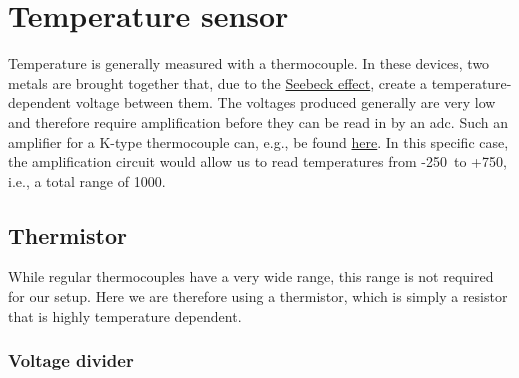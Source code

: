 
\chapter{Temperature sensor}\label{chap:temperature}

Temperature is generally measured with a thermocouple. In these devices, two metals are brought together that, due to the \href{https://en.wikipedia.org/wiki/Thermoelectric_effect}{Seebeck effect}, create a temperature-dependent voltage between them. The voltages produced generally are very low and therefore require amplification before they can be read in by an \ac{adc}. Such an amplifier for a K-type thermocouple can, e.g., be found \href{https://www.adafruit.com/product/1778}{here}. In this specific case, the amplification circuit would allow us to read temperatures from -250\celsius\ to +750\celsius, i.e., a total range of 1000\celsius.



\section{Thermistor}

While regular thermocouples have a very wide range, this range is not required for our setup. Here we are therefore using a thermistor, which is simply a resistor that is highly temperature dependent. 

\subsection{Voltage divider}

